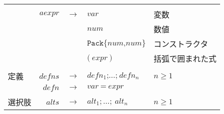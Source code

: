 \documentclass{jarticle}
\begin{document}
\begin{center}
\begin{tabular} {|l r c l l|}
		                     &           &               &                                                                                                                                                                  &                         \\
		                     & $aexpr$   & $\rightarrow$ & $var$                                                                                                                                                            & 変数                    \\
		                     &           & \textbar      & $num$                                                                                                                                                            & 数値                    \\
		                     &           & \textbar      & $\texttt{Pack\{} num \texttt{,} num \texttt{\}}$                                                                                                                 & コンストラクタ          \\
		                     &           & \textbar      & $\texttt{(} ~ expr ~ \texttt{)}$                                                                                                                                 & 括弧で囲まれた式        \\
		                     &           &               &                                                                                                                                                                  &                         \\
		定義                 & $defns$   & $\rightarrow$ & $defn_1 \texttt{;} \ldots \texttt{;} ~ defn_n$                                                                                                                   & $n \geq 1$              \\
		                     & $defn$    & $\rightarrow$ & $var ~ \texttt{=} ~ expr$                                                                                                                                        &                         \\
		                     &           &               &                                                                                                                                                                  &                         \\
		選択肢               & $alts$    & $\rightarrow$ & $alt_1 ; \ldots ; ~ alt_n$                                                                                                                                       & $n \geq 1$              \\

\end{tabular}
\end{center}
\end{document}
